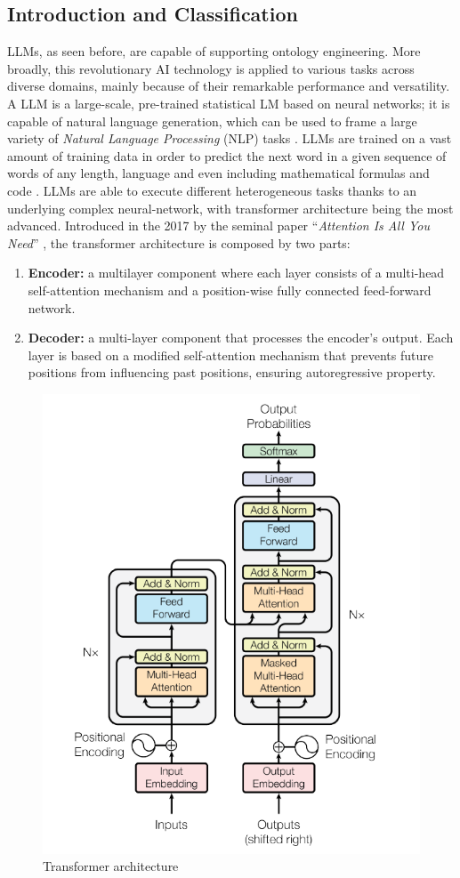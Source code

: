\subsection{Introduction and Classification}
LLMs, as seen before, are capable of supporting ontology engineering.
More broadly, this revolutionary AI technology is applied to various tasks across diverse domains, mainly because of their remarkable performance and versatility.
A LLM is a large-scale, pre-trained statistical LM based on neural networks; it is capable of natural language generation, which can be used to frame a large variety of \textit{Natural Language Processing} (NLP) tasks \cite{zhao2023survey}.
LLMs are trained on a vast amount of training data in order to predict the next word in a given sequence of words of any length, language and even including mathematical formulas and code \cite{zhao2023survey}.
LLMs are able to execute different heterogeneous tasks thanks to an underlying complex neural-network, with transformer architecture being the most advanced.
Introduced in the 2017 by the seminal paper ``\textit{Attention Is All You Need}'' \cite{vaswani2017attention}, the transformer architecture is composed by two parts:
\begin{enumerate}
    \item \textbf{Encoder:} a multilayer component where each layer consists of a multi-head self-attention mechanism and a position-wise fully connected feed-forward network.
    
    \item \textbf{Decoder:} a multi-layer component that processes the encoder's output. Each layer is based on a modified self-attention mechanism that prevents future positions from influencing past positions, ensuring autoregressive property.
\end{enumerate}
\begin{figure}[H]
    \centering
    \includegraphics[width=0.5\linewidth]{Figures/fig_17.png}
    \caption{Transformer architecture}
    \label{fig:17}
\end{figure}
